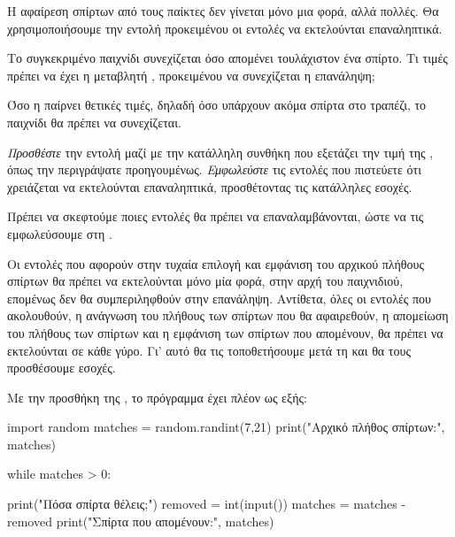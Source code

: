 \documentclass[a4paper,11pt,oneside]{book}
\begin{document}
\begin{step}
Η αφαίρεση σπίρτων από τους παίκτες δεν γίνεται μόνο μια φορά, αλλά πολλές. Θα χρησιμοποιήσουμε την εντολή  προκειμένου οι εντολές να εκτελούνται επαναληπτικά.

Το συγκεκριμένο παιχνίδι συνεχίζεται όσο απομένει τουλάχιστον ένα σπίρτο. Τι τιμές πρέπει να έχει η μεταβλητή , προκειμένου να συνεχίζεται η επανάληψη;

\begin{answer}
Όσο η  παίρνει θετικές τιμές, δηλαδή όσο υπάρχουν ακόμα σπίρτα στο τραπέζι, το παιχνίδι θα πρέπει να συνεχίζεται. 
\end{answer}

\emph{Προσθέστε} την εντολή  μαζί με την κατάλληλη συνθήκη που εξετάζει την τιμή της , όπως την περιγράψατε προηγουμένως. \emph{Εμφωλεύστε} τις εντολές που πιστεύετε ότι χρειάζεται να εκτελούνται επαναληπτικά, προσθέτοντας τις κατάλληλες εσοχές.

\begin{answer}
Πρέπει να σκεφτούμε ποιες εντολές θα πρέπει να επαναλαμβάνονται, ώστε να τις εμφωλεύσουμε στη . 

Οι εντολές που αφορούν στην τυχαία επιλογή και εμφάνιση του αρχικού πλήθους σπίρτων θα πρέπει να εκτελούνται μόνο μία φορά, στην αρχή του παιχνιδιού, επομένως δεν θα συμπεριληφθούν στην επανάληψη. Αντίθετα, όλες οι εντολές που ακολουθούν, η ανάγνωση του πλήθους των σπίρτων που θα αφαιρεθούν, η απομείωση του πλήθους των σπίρτων και η εμφάνιση των σπίρτων που απομένουν, θα πρέπει να εκτελούνται σε κάθε γύρο. Γι' αυτό θα τις τοποθετήσουμε μετά τη  και θα τους προσθέσουμε εσοχές.

Με την προσθήκη της , το πρόγραμμα έχει πλέον ως εξής:

\begin{pyplain}
import random
matches = random.randint(7,21)
print("Αρχικό πλήθος σπίρτων:", matches)
\end{pyplain}
\begin{pynew}
while matches > 0:
\end{pynew}
\begin{pyplain}
    print("Πόσα σπίρτα θέλεις;")
    removed = int(input())
    matches = matches - removed
    print("Σπίρτα που απομένουν:", matches)
\end{pyplain}

\end{answer}


\end{step}
\end{document}
